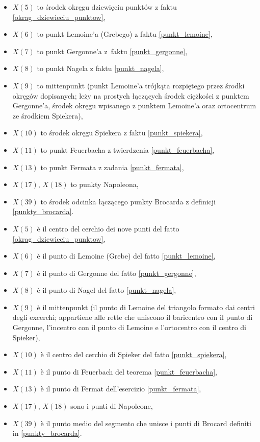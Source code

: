 \begin{itemize}
\item $X(5)$ to środek okręgu dziewięciu punktów z faktu \ref{okrag_dziewieciu_punktow}, %
\item $X(6)$ to punkt Lemoine'a (Grebego) z faktu \ref{punkt_lemoine}, %
\item $X(7)$ to punkt Gergonne'a z~faktu \ref{punkt_gergonne}, %
\item $X(8)$ to punkt Nagela z faktu \ref{punkt_nagela}, %
\item $X(9)$ to mittenpunkt (punkt Lemoine'a trójkąta rozpiętego przez środki okręgów dopisanych; leży na prostych łączących środek ciężkości z punktem Gergonne'a, środek okręgu wpisanego z punktem Lemoine'a oraz ortocentrum ze środkiem Spiekera), %
\item $X(10)$ to środek okręgu Spiekera z faktu \ref{punkt_spiekera}, %
\item $X(11)$ to punkt Feuerbacha z twierdzenia \ref{punkt_feuerbacha}, %
\item $X(13)$ to punkt Fermata z zadania \ref{punkt_fermata}, %
\item $X(17)$, $X(18)$ to punkty Napoleona, %
\item $X(39)$ to środek odcinka łączącego punkty Brocarda z definicji \ref{punkty_brocarda}. %
\item $X(5)$ è il centro del cerchio dei nove punti del fatto \ref{okrag_dziewieciu_punktow}, %
\item $X(6)$ è il punto di Lemoine (Grebe) del fatto \ref{punkt_lemoine}, %
\item $X(7)$ è il punto di Gergonne del fatto \ref{punkt_gergonne}, %
\item $X(8)$ è il punto di Nagel del fatto \ref{punkt_nagela}, %
\item $X(9)$ è il mittenpunkt (il punto di Lemoine del triangolo formato dai centri degli excerchi; appartiene alle rette che uniscono il baricentro con il punto di Gergonne, l'incentro con il punto di Lemoine e l'ortocentro con il centro di Spieker), %
\item $X(10)$ è il centro del cerchio di Spieker del fatto \ref{punkt_spiekera}, %
\item $X(11)$ è il punto di Feuerbach del teorema \ref{punkt_feuerbacha}, %
\item $X(13)$ è il punto di Fermat dell'esercizio \ref{punkt_fermata}, %
\item $X(17)$, $X(18)$ sono i punti di Napoleone, %
\item $X(39)$ è il punto medio del segmento che unisce i punti di Brocard definiti in \ref{punkty_brocarda}. %
\end{itemize}

